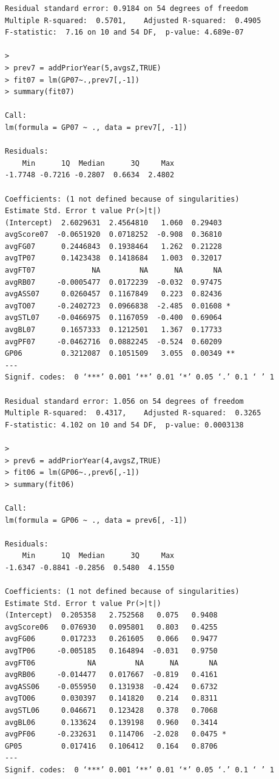 \documentclass[]{scrartcl}
\begin{document}
\begin{verbatim}
Residual standard error: 0.9184 on 54 degrees of freedom
Multiple R-squared:  0.5701,	Adjusted R-squared:  0.4905 
F-statistic:  7.16 on 10 and 54 DF,  p-value: 4.689e-07

> 
> prev7 = addPriorYear(5,avgsZ,TRUE)
> fit07 = lm(GP07~.,prev7[,-1])
> summary(fit07)

Call:
lm(formula = GP07 ~ ., data = prev7[, -1])

Residuals:
    Min      1Q  Median      3Q     Max 
-1.7748 -0.7216 -0.2807  0.6634  2.4802 

Coefficients: (1 not defined because of singularities)
Estimate Std. Error t value Pr(>|t|)   
(Intercept)  2.6029631  2.4564810   1.060  0.29403   
avgScore07  -0.0651920  0.0718252  -0.908  0.36810   
avgFG07      0.2446843  0.1938464   1.262  0.21228   
avgTP07      0.1423438  0.1418684   1.003  0.32017   
avgFT07             NA         NA      NA       NA   
avgRB07     -0.0005477  0.0172239  -0.032  0.97475   
avgASS07     0.0260457  0.1167849   0.223  0.82436   
avgTO07     -0.2402723  0.0966838  -2.485  0.01608 * 
avgSTL07    -0.0466975  0.1167059  -0.400  0.69064   
avgBL07      0.1657333  0.1212501   1.367  0.17733   
avgPF07     -0.0462716  0.0882245  -0.524  0.60209   
GP06         0.3212087  0.1051509   3.055  0.00349 **
---
Signif. codes:  0 ‘***’ 0.001 ‘**’ 0.01 ‘*’ 0.05 ‘.’ 0.1 ‘ ’ 1

Residual standard error: 1.056 on 54 degrees of freedom
Multiple R-squared:  0.4317,	Adjusted R-squared:  0.3265 
F-statistic: 4.102 on 10 and 54 DF,  p-value: 0.0003138

> 
> prev6 = addPriorYear(4,avgsZ,TRUE)
> fit06 = lm(GP06~.,prev6[,-1])
> summary(fit06)

Call:
lm(formula = GP06 ~ ., data = prev6[, -1])

Residuals:
    Min      1Q  Median      3Q     Max 
-1.6347 -0.8841 -0.2856  0.5480  4.1550 

Coefficients: (1 not defined because of singularities)
Estimate Std. Error t value Pr(>|t|)  
(Intercept)  0.205358   2.752568   0.075   0.9408  
avgScore06   0.076930   0.095801   0.803   0.4255  
avgFG06      0.017233   0.261605   0.066   0.9477  
avgTP06     -0.005185   0.164894  -0.031   0.9750  
avgFT06            NA         NA      NA       NA  
avgRB06     -0.014477   0.017667  -0.819   0.4161  
avgASS06    -0.055950   0.131938  -0.424   0.6732  
avgTO06      0.030397   0.141820   0.214   0.8311  
avgSTL06     0.046671   0.123428   0.378   0.7068  
avgBL06      0.133624   0.139198   0.960   0.3414  
avgPF06     -0.232631   0.114706  -2.028   0.0475 *
GP05         0.017416   0.106412   0.164   0.8706  
---
Signif. codes:  0 ‘***’ 0.001 ‘**’ 0.01 ‘*’ 0.05 ‘.’ 0.1 ‘ ’ 1


\end{verbatim}
\end{document}
